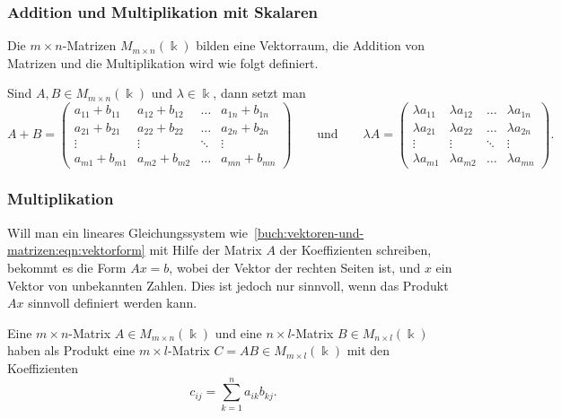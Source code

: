 \subsubsection{Addition und Multiplikation mit Skalaren}
Die $m\times n$-Matrizen $M_{m\times n}(\Bbbk)$ bilden eine Vektorraum,
die Addition von Matrizen und die Multiplikation wird wie folgt definiert.

\begin{definition}
Sind $A,B\in M_{m\times n}(\Bbbk)$ und $\lambda\in\Bbbk$, dann setzt man
\[
A+B
=
\begin{pmatrix}
a_{11}+b_{11}&a_{12}+b_{12}&\dots &a_{1n}+b_{1n}\\
a_{21}+b_{21}&a_{22}+b_{22}&\dots &a_{2n}+b_{2n}\\
\vdots       &\vdots       &\ddots&\vdots       \\
a_{m1}+b_{m1}&a_{m2}+b_{m2}&\dots &a_{mn}+b_{mn}
\end{pmatrix}
\qquad\text{und}\qquad
\lambda A
=
\begin{pmatrix}
\lambda a_{11}&\lambda a_{12}&\dots &\lambda a_{1n}\\
\lambda a_{21}&\lambda a_{22}&\dots &\lambda a_{2n}\\
\vdots        &\vdots        &\ddots&\vdots        \\
\lambda a_{m1}&\lambda a_{m2}&\dots &\lambda a_{mn}
\end{pmatrix}.
\]
\end{definition}

\subsubsection{Multiplikation}
Will man ein lineares Gleichungssystem
wie~\eqref{buch:vektoren-und-matrizen:eqn:vektorform}
mit Hilfe der Matrix $A$ der
Koeffizienten schreiben, bekommt es die Form $Ax=b$, wobei der Vektor
der rechten Seiten ist, und $x$ ein Vektor von unbekannten Zahlen.
Dies ist jedoch nur sinnvoll, wenn das Produkt $Ax$ sinnvoll definiert
werden kann.

\begin{definition}
\label{buch:vektoren-und-matrizen:def:matrixmultiplikation}
Eine $m\times n$-Matrix $A\in M_{m\times n}(\Bbbk)$ und eine
$n\times l$-Matrix $B\in M_{n\times l}(\Bbbk)$ haben als Produkt
eine $m\times l$-Matrix $C=AB\in M_{m\times l}(\Bbbk)$ mit den
Koeffizienten
\begin{equation}
c_{i\!j} = \sum_{k=1}^n a_{ik} b_{kj}.
\label{buch:vektoren-und-matrizen:eqn:matrixmultiplikation}
\end{equation}
\end{definition}

